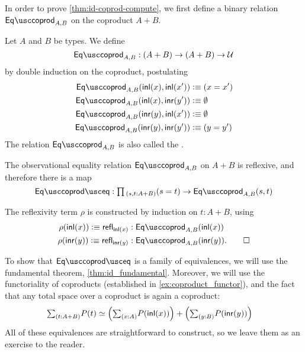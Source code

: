 In order to prove \cref{thm:id-coprod-compute}, we first define
a binary relation $\Eqcoprod_{A,B}$ on the coproduct $A+B$.

\begin{defn}
Let $A$ and $B$ be types. We define 
\begin{equation*}
\Eqcoprod_{A,B} : (A+B)\to (A+B)\to\UU
\end{equation*}
by double induction on the coproduct, postulating
\begin{align*}
\Eqcoprod_{A,B}(\inl(x),\inl(x')) & \defeq (x=x') \\
\Eqcoprod_{A,B}(\inl(x),\inr(y')) & \defeq \emptyt \\
\Eqcoprod_{A,B}(\inr(y),\inl(x')) & \defeq \emptyt \\
\Eqcoprod_{A,B}(\inr(y),\inr(y')) & \defeq (y=y')
\end{align*}
The relation $\Eqcoprod_{A,B}$ is also called the .
\end{defn}

\begin{lem}
The observational equality relation $\Eqcoprod_{A,B}$ on $A+B$ is reflexive, and therefore there is a map
\begin{equation*}
\Eqcoprodeq:\prd{s,t:A+B} (s=t)\to \Eqcoprod_{A,B}(s,t)
\end{equation*}
\end{lem}

\begin{constr}
The reflexivity term $\rho$ is constructed by induction on $t:A+B$, using
\begin{align*}
\rho(\inl(x))\defeq \refl{\inl(x)}  & : \Eqcoprod_{A,B}(\inl(x)) \\
\rho(\inr(y))\defeq \refl{\inr(y)} & : \Eqcoprod_{A,B}(\inr(y)).\qedhere
\end{align*}
\end{constr}

To show that $\Eqcoprodeq$ is a family of equivalences, we will use the fundamental theorem, \cref{thm:id_fundamental}. Moreover, we will use the functoriality of coproducts (established in \cref{ex:coproduct_functor}), and the fact that any total space over a coproduct is again a coproduct:
\begin{align*}
\sm{t:A+B}P(t) & \eqvsym \Big(\sm{x:A}P(\inl(x))\Big)+\Big(\sm{y:B}P(\inr(y))\Big)
\end{align*}
All of these equivalences are straightforward to construct, so we leave them as an exercise to the reader. 

